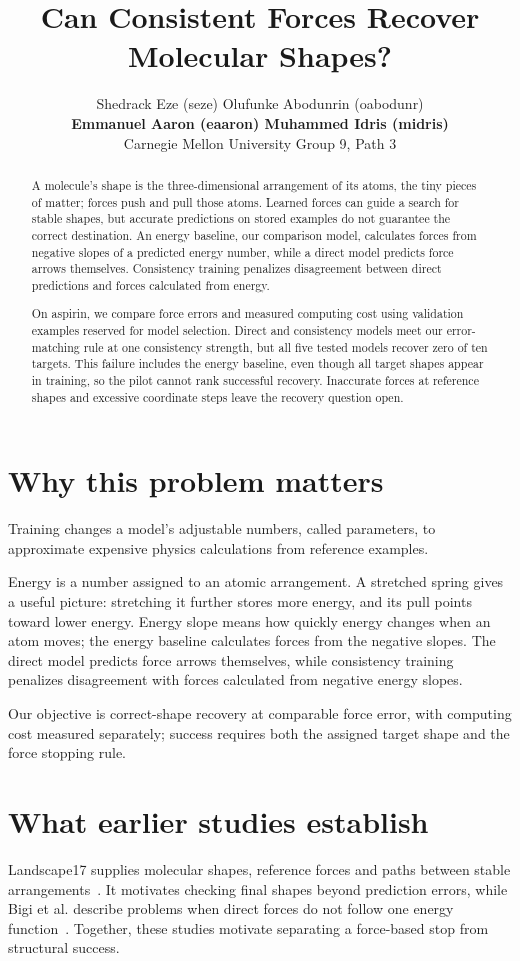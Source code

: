 \documentclass{article}
\title{Can Consistent Forces Recover Molecular Shapes?}
\author{Shedrack Eze (seze) \quad Olufunke Abodunrin (oabodunr)\\
\textbf{Emmanuel Aaron (eaaron) \quad Muhammed Idris (midris)}\\
Carnegie Mellon University \quad Group 9, Path 3}
\begin{document}
\maketitle
\begin{abstract}
A molecule's shape is the three-dimensional arrangement of its atoms, the tiny pieces of matter; forces push and pull those atoms. Learned forces can guide a search for stable shapes, but accurate predictions on stored examples do not guarantee the correct destination. An energy baseline, our comparison model, calculates forces from negative slopes of a predicted energy number, while a direct model predicts force arrows themselves. Consistency training penalizes disagreement between direct predictions and forces calculated from energy.

On aspirin, we compare force errors and measured computing cost using validation examples reserved for model selection. Direct and consistency models meet our error-matching rule at one consistency strength, but all five tested models recover zero of ten targets. This failure includes the energy baseline, even though all target shapes appear in training, so the pilot cannot rank successful recovery. Inaccurate forces at reference shapes and excessive coordinate steps leave the recovery question open.
\end{abstract}
\section{Why this problem matters}
Training changes a model's adjustable numbers, called parameters, to approximate expensive physics calculations from reference examples.

Energy is a number assigned to an atomic arrangement. A stretched spring gives a useful picture: stretching it further stores more energy, and its pull points toward lower energy. Energy slope means how quickly energy changes when an atom moves; the energy baseline calculates forces from the negative slopes. The direct model predicts force arrows themselves, while consistency training penalizes disagreement with forces calculated from negative energy slopes.

Our objective is correct-shape recovery at comparable force error, with computing cost measured separately; success requires both the assigned target shape and the force stopping rule.
\section{What earlier studies establish}
Landscape17 supplies molecular shapes, reference forces and paths between stable arrangements~\cite{landscape}. It motivates checking final shapes beyond prediction errors, while Bigi et al. describe problems when direct forces do not follow one energy function~\cite{bigi}. Together, these studies motivate separating a force-based stop from structural success.
\end{document}
